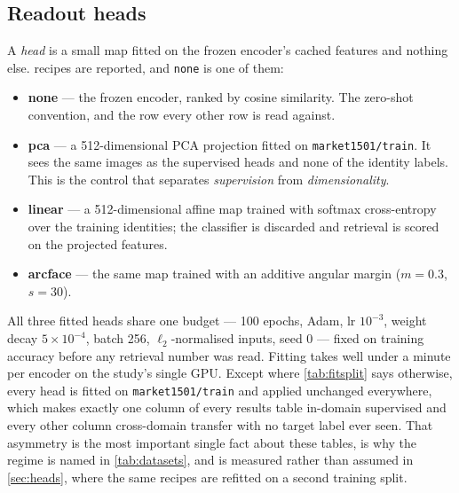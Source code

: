 \subsection{Readout heads}
A \emph{head} is a small map fitted on the frozen encoder's cached features and nothing else.
\nHeadRecipes{} recipes are reported, and \texttt{none} is one of them:
\begin{itemize}
  \item \textbf{none} --- the frozen encoder, ranked by cosine similarity. The zero-shot
        convention, and the row every other row is read against.
  \item \textbf{pca} --- a 512-dimensional PCA projection fitted on
        \texttt{market1501/train}. It sees the same \nHeadImages{} images as the supervised
        heads and none of the \nHeadIdentities{} identity labels. This is the control that
        separates \emph{supervision} from \emph{dimensionality}.
  \item \textbf{linear} --- a 512-dimensional affine map trained with softmax
        cross-entropy over the \nHeadIdentities{} training identities; the classifier is
        discarded and retrieval is scored on the projected features.
  \item \textbf{arcface} --- the same map trained with an additive angular margin
        \cite{deng2019arcface} ($m=0.3$, $s=30$).
\end{itemize}
All three fitted heads share one budget --- 100 epochs, Adam, lr $10^{-3}$, weight decay
$5\times10^{-4}$, batch 256, $\ell_2$-normalised inputs, seed 0 --- fixed on training accuracy
before any retrieval number was read. Fitting takes well under a minute per encoder on the
study's single GPU. Except where \cref{tab:fitsplit} says otherwise, every head is fitted on
\texttt{market1501/train} and applied unchanged everywhere, which makes exactly one column of
every results table in-domain supervised and every other column cross-domain transfer with no
target label ever seen. That asymmetry is the most important single fact about these tables, is
why the regime is named in \cref{tab:datasets}, and is measured rather than assumed in
\cref{sec:heads}, where the same recipes are refitted on a second training split.

\begin{table}[t]
\centering
\caption{Datasets and protocols. \emph{regime} is relative to the heads, all of which are
fitted on \texttt{market1501/train}; only Market-1501 is in-domain. Query and gallery sizes are
read from the run records, so a cross-dataset comparison of absolute scores can be checked
against the search size that produced it.}
\label{tab:datasets}
\scriptsize
\setlength{\tabcolsep}{3pt}

\end{table}

